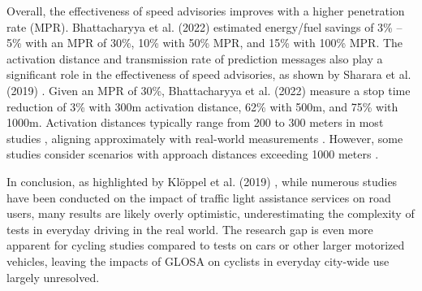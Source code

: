 Overall, the effectiveness of speed advisories improves with a higher penetration rate (MPR). Bhattacharyya et al. (2022) \cite{bhattacharyya_assessing_2022} estimated energy/fuel savings of 3\% -- 5\% with an MPR of 30\%, 10\% with 50\% MPR, and 15\% with 100\% MPR. The activation distance and transmission rate of prediction messages also play a significant role in the effectiveness of speed advisories, as shown by Sharara et al. (2019) \cite{sharara_impact_2019}. Given an MPR of 30\%, Bhattacharyya et al. (2022) \cite{bhattacharyya_assessing_2022} measure a stop time reduction of 3\% with 300m activation distance, 62\% with 500m, and 75\% with 1000m. Activation distances typically range from 200 to 300 meters in most studies \cite{xia_indirect_2011, raubitschek_predictive_2011, rakha_eco-driving_2011, rakha_aeris_2012, mahler_reducing_2012, tal_vehicular-communications-based_2016, xu_bb_2015, de_nunzio_eco-driving_2015, luo_green_2017, kloeppel_performance_2019, dabiri_optimized_2020, hu_lane-level_2023}, aligning approximately with real-world measurements \cite{bernais_design_2016}. However, some studies consider scenarios with approach distances exceeding 1000 meters \cite{tielert_impact_2010, asadi_predictive_2011, krajzewicz_preparing_2012, nguyen_efficient_2016, karoui_efficiency_2018, plianos_predictive_2018, sharara_impact_2019, simchon_real-time_2020, bhattacharyya_assessing_2022}.

In conclusion, as highlighted by Klöppel et al. (2019) \cite{kloeppel_performance_2019}, while numerous studies have been conducted on the impact of traffic light assistance services on road users, many results are likely overly optimistic, underestimating the complexity of tests in everyday driving in the real world. The research gap is even more apparent for cycling studies compared to tests on cars or other larger motorized vehicles, leaving the impacts of GLOSA on cyclists in everyday city-wide use largely unresolved.

